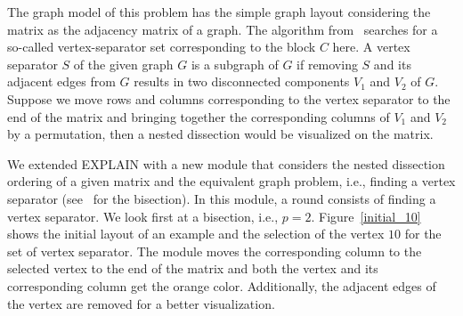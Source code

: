 \documentclass[12pt, twoside,a4paper,toc=bibliography]{scrbook}
\begin{document}
The graph model of this problem has the simple graph layout considering the matrix
as the adjacency matrix of a graph.
The algorithm from~\cite{2014:02} searches for a so-called vertex-separator set
corresponding to the block $C$ here. A vertex separator $S$ of the given graph $G$
is a subgraph of $G$ if removing $S$ and its adjacent edges from $G$ results in two
disconnected components $V_1$ and $V_2$ of $G$.
Suppose we move rows and columns corresponding to the vertex separator to the end of
the matrix and bringing together
the corresponding columns of $V_1$ and $V_2$ by a permutation,
then a nested dissection would be visualized on the matrix.

We extended \mbox{EXPLAIN} with
a new module that considers the nested dissection ordering
of a given matrix and the equivalent graph problem, i.e.,
finding a vertex separator (see~\cite{2014:02} for the bisection).
In this module, a round consists of finding a vertex separator.
We look first at a bisection, i.e., $p=2$.
Figure~\ref{initial_10} shows the initial layout of an example
and the selection of the vertex $10$ for the set of vertex separator. The module moves the
corresponding column to the selected vertex to the end of the matrix
and both the vertex and its corresponding column get the orange color.
Additionally, the adjacent edges of the vertex are removed for a better visualization.
\end{document}

